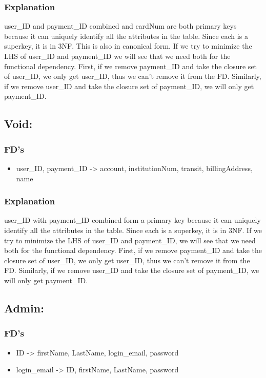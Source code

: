 \subsubsection{Explanation}
user\_ID and payment\_ID combined and cardNum are both primary keys because it can uniquely identify all the attributes in the table. Since each is a superkey, it is in 3NF. This is also in canonical form. If we try to minimize the LHS of user\_ID and payment\_ID we will see that we need both for the functional dependency. First, if we remove payment\_ID and take the closure set of user\_ID, we only get user\_ID, thus we can’t remove it from the FD. Similarly, if we remove user\_ID and take the closure set of payment\_ID, we will only get payment\_ID. 

\newpage
\subsection{Void:}
\subsubsection{FD's}
\begin{itemize}
    \item user\_ID, payment\_ID -> account, institutionNum, transit, billingAddress, name
\end{itemize}

\subsubsection{Explanation}
user\_ID with payment\_ID combined form a primary key because it can uniquely identify all the attributes in the table. Since each is a superkey, it is in 3NF. If we try to minimize the LHS of user\_ID and payment\_ID, we will see that we need both for the functional dependency. First, if we remove payment\_ID and take the closure set of user\_ID, we only get user\_ID, thus we can’t remove it from the FD. Similarly, if we remove user\_ID and take the closure set of payment\_ID, we will only get payment\_ID.

\subsection{Admin:}
\subsubsection{FD's}
\begin{itemize}
    \item ID -> firstName, LastName, login\_email, password
    \item login\_email -> ID, firstName, LastName, password
\end{itemize}

